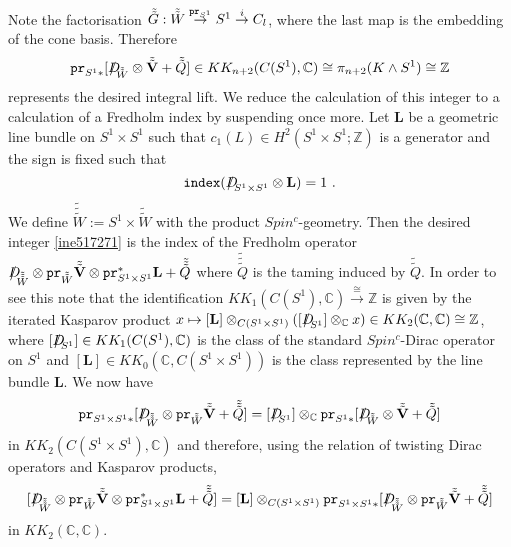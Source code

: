 \documentclass[12pt]{article}
\newcommand{\Z}{{\mathbb{Z}}}
\newcommand{\C}{{\mathbb{C}}}
\newcommand{\bV}{{\mathbf{V}}}
\newcommand{\Dirac}{{D\hspace{-0.27cm}/}}
\newcommand{\ind}{{\tt index}}
\newcommand{\pr}{{\tt pr}}
\begin{document}
\newcommand{\bL}{\mathbf{L}}
Note the factorisation
$\tilde{\tilde G}:\tilde{\tilde W}\stackrel{\pr_{S^{1}}}{\to}S^{1}\stackrel{i}{\to} C_{l}$,
where the last map is the embedding of the cone basis.
Therefore
\begin{equation}\label{ine517271}\pr_{S^{1}*}[\Dirac_{\tilde{\tilde W}}\otimes \tilde {\tilde \bV}+\tilde {\tilde Q}]\in KK_{n+2}(C(S^{1}),\C)\cong \pi_{n+2}(K\wedge S^{1})\cong \Z\end{equation}
represents the desired integral lift. We reduce the calculation of this integer to a calculation of a Fredholm index by suspending once more.
Let $\bL$  be a geometric line bundle on $S^{1}\times S^{1}$ such that
  $c_{1}(L)\in H^{2}(S^{1}\times S^{1};\Z)$ is a generator and the sign is fixed such that
  \begin{equation}\label{hebfjefefiof}\ind(\Dirac_{S^{1}\times S^{1}}\otimes \bL)=1\ .\end{equation} We define $\tilde{\tilde{\tilde W}}:=S^{1}\times \tilde{\tilde W}$ with the product $Spin^{c}$-geometry. Then the desired integer \eqref{ine517271} is the index
of the Fredholm operator 
$\Dirac_{\tilde{\tilde{\tilde W}}}\otimes \pr_{\tilde{\tilde W}} \tilde{\tilde \bV}\otimes \pr_{S^{1}\times S^{1}}^{*} \bL+ \tilde{\tilde {\tilde Q}}$
where $\tilde{\tilde {\tilde Q}}$ is the taming induced by $\tilde {\tilde Q}$.
In order to see this note that the identification 
$KK_{1}(C(S^{1}),\C)\stackrel{\cong}{\to} \Z$ is given by the iterated Kasparov product
$x\mapsto [\bL]\otimes_{C(S^{1}\times S^{1})} ([\Dirac_{S^{1}}]\otimes_{\C} x)\in KK_{2}(\C,\C)\cong \Z$, 
where $[\Dirac_{S^{1}}]\in KK_{1}(C(S^{1}),\C)$ is the class of the standard $Spin^{c}$-Dirac operator on $S^{1}$ and
$[\bL]\in KK_{0}(\C,C(S^{1}\times S^{1}))$
is the class represented by the line bundle $\bL$.
 We now have $$\pr_{S^{1}\times S^{1}*}[\Dirac_{\tilde{\tilde{\tilde W}}}\otimes \pr_{\tilde{\tilde W}} \tilde{\tilde \bV} + \tilde{\tilde {\tilde Q}}]=[\Dirac_{S^{1}}]\otimes_{\C}   \pr_{S^{1}*}[\Dirac_{\tilde{\tilde W}}\otimes \tilde {\tilde \bV}+\tilde {\tilde Q}]$$
 in $KK_{2}(C(S^{1}\times S^{1}),\C)$ and therefore, using the relation of twisting Dirac operators and Kasparov products,
$$[
\Dirac_{\tilde{\tilde{\tilde W}}}\otimes \pr_{\tilde{\tilde W}} \tilde{\tilde \bV}\otimes \pr_{S^{1}\times S^{1}}^{*} \bL+ \tilde{\tilde {\tilde Q}}]=[\bL]\otimes_{C(S^{1}\times S^{1})} \pr_{S^{1}\times S^{1}*}[\Dirac_{\tilde{\tilde{\tilde W}}}\otimes \pr_{\tilde{\tilde W}} \tilde{\tilde \bV} + \tilde{\tilde {\tilde Q}}]$$
in $KK_{2}(\C,\C)$.
\end{document}
